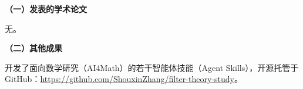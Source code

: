 \begin{publication}
\noindent\textbf{（一）发表的学术论文}

无。

\vspace{0.5\baselineskip}
\noindent\textbf{（二）其他成果}
\begin{publist}
\item 开发了面向数学研究（AI4Math）的若干智能体技能（Agent Skills），开源托管于 GitHub：\url{https://github.com/ShouxinZhang/filter-theory-study}。
\end{publist}
\end{publication}
